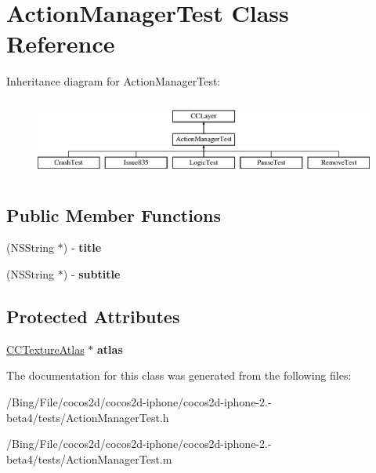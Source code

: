 \hypertarget{interface_action_manager_test}{\section{Action\-Manager\-Test Class Reference}
\label{interface_action_manager_test}
}
Inheritance diagram for Action\-Manager\-Test\-:\begin{figure}[H]
\begin{center}
\leavevmode
\includegraphics[height=2.584615cm]{interface_action_manager_test}
\end{center}
\end{figure}
\subsection*{Public Member Functions}
\begin{DoxyCompactItemize}
\item 
\hypertarget{interface_action_manager_test_a27eaae86924fe009b1662e80c50e4c8c}{(N\-S\-String $\ast$) -\/ {\bfseries title}}\label{interface_action_manager_test_a27eaae86924fe009b1662e80c50e4c8c}

\item 
\hypertarget{interface_action_manager_test_a1aebdd28a1ed1c445fb90dadbd4c49a3}{(N\-S\-String $\ast$) -\/ {\bfseries subtitle}}\label{interface_action_manager_test_a1aebdd28a1ed1c445fb90dadbd4c49a3}

\end{DoxyCompactItemize}
\subsection*{Protected Attributes}
\begin{DoxyCompactItemize}
\item 
\hypertarget{interface_action_manager_test_a44b68d626de1b5839b2166b7ec285a31}{\hyperlink{interface_c_c_texture_atlas}{C\-C\-Texture\-Atlas} $\ast$ {\bfseries atlas}}\label{interface_action_manager_test_a44b68d626de1b5839b2166b7ec285a31}

\end{DoxyCompactItemize}


The documentation for this class was generated from the following files\-:\begin{DoxyCompactItemize}
\item 
/\-Bing/\-File/cocos2d/cocos2d-\/iphone/cocos2d-\/iphone-\/2.-\/beta4/tests/Action\-Manager\-Test.\-h\item 
/\-Bing/\-File/cocos2d/cocos2d-\/iphone/cocos2d-\/iphone-\/2.-\/beta4/tests/Action\-Manager\-Test.\-m\end{DoxyCompactItemize}

